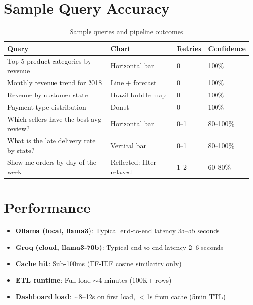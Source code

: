 \documentclass[12pt,a4paper]{report}
\begin{document}
\section{Sample Query Accuracy}

\begin{table}[H]
  \centering
  \caption{Sample queries and pipeline outcomes}
  \label{tab:queries}
  \renewcommand{\arraystretch}{1.3}
  \begin{tabularx}{\textwidth}{Xlll}
    \toprule
    \textbf{Query} & \textbf{Chart} & \textbf{Retries} & \textbf{Confidence} \\
    \midrule
    Top 5 product categories by revenue & Horizontal bar & 0 & 100\% \\
    Monthly revenue trend for 2018 & Line + forecast & 0 & 100\% \\
    Revenue by customer state & Brazil bubble map & 0 & 100\% \\
    Payment type distribution & Donut & 0 & 100\% \\
    Which sellers have the best avg review? & Horizontal bar & 0--1 & 80--100\% \\
    What is the late delivery rate by state? & Vertical bar & 0--1 & 80--100\% \\
    Show me orders by day of the week & Reflected: filter relaxed & 1--2 & 60--80\% \\
    \bottomrule
  \end{tabularx}
\end{table}

\section{Performance}

\begin{itemize}
  \item \textbf{Ollama (local, llama3)}: Typical end-to-end latency 35--55 seconds
  \item \textbf{Groq (cloud, llama3-70b)}: Typical end-to-end latency 2--6 seconds
  \item \textbf{Cache hit}: Sub-100ms (TF-IDF cosine similarity only)
  \item \textbf{ETL runtime}: Full load $\sim$4 minutes (100K+ rows)
  \item \textbf{Dashboard load}: $\sim$8--12s on first load, $<$1s from cache (5min TTL)
\end{itemize}

\end{document}
